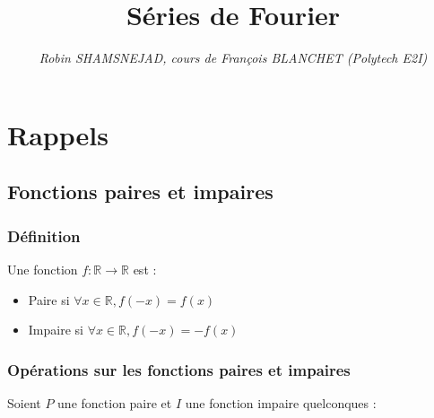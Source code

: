\documentclass[12pt, a4paper]{article}
\title{\textbf{Séries de Fourier}}
\author{\textit{Robin SHAMSNEJAD, cours de François BLANCHET (Polytech E2I)}}
\date{}
\begin{document}
\maketitle

\tableofcontents
\clearpage

\section{Rappels}

\subsection{Fonctions paires et impaires}

\subsubsection{Définition}

\begin{tcolorbox}
	Une fonction $f:\mathbb{R} \to \mathbb{R}$ est :
	\begin{itemize}
		\item Paire si $\forall x \in \mathbb{R}, f(-x) = f(x)$
		\item Impaire si $\forall x \in \mathbb{R}, f(-x) = -f(x)$
	\end{itemize}
\end{tcolorbox}

\subsubsection{Opérations sur les fonctions paires et impaires}

Soient $P$ une fonction paire et $I$ une fonction impaire quelconques :
\end{document}
